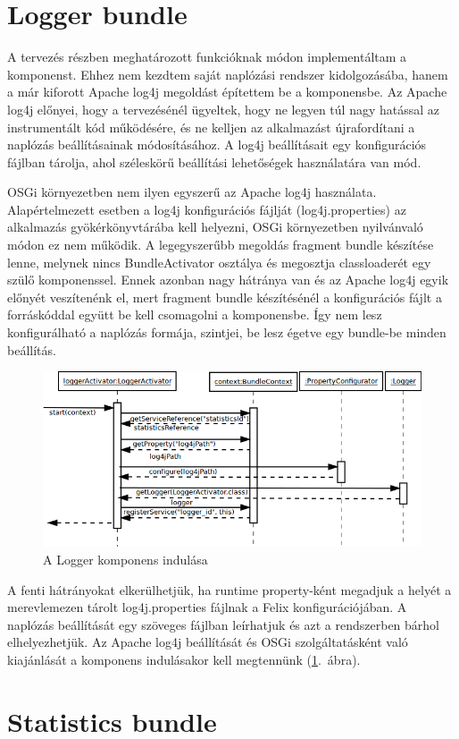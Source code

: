 
\section{Logger bundle}
\label{sec:loggerbundle}

A tervezés részben meghatározott funkcióknak módon implementáltam a komponenst. Ehhez nem kezdtem saját naplózási rendszer kidolgozásába, hanem a már kiforott Apache log4j megoldást építettem be a komponensbe. Az Apache log4j előnyei, hogy a tervezésénél ügyeltek, hogy ne legyen túl nagy hatással az instrumentált kód működésére, és ne kelljen az alkalmazást újrafordítani a naplózás beállításainak módosításához. A log4j beállításait egy konfigurációs fájlban tárolja, ahol széleskörű beállítási lehetőségek használatára van mód.

OSGi környezetben nem ilyen egyszerű az Apache log4j használata. Alapértelmezett esetben a log4j konfigurációs fájlját (log4j.properties) az alkalmazás gyökérkönyvtárába kell helyezni, OSGi környezetben nyilvánvaló módon ez nem működik. A legegyszerűbb megoldás fragment bundle készítése lenne, melynek nincs BundleActivator osztálya és megosztja classloaderét egy szülő komponenssel. Ennek azonban nagy hátránya van és az Apache log4j egyik előnyét veszítenénk el, mert fragment bundle készítésénél a konfigurációs fájlt a forráskóddal együtt be kell csomagolni a komponensbe. Így nem lesz konfigurálható a naplózás formája, szintjei, be lesz égetve egy bundle-be minden beállítás.

\begin{figure}[htp]
\centering
\includegraphics[scale=0.5]{img/sequence_logger}
\caption{A Logger komponens indulása}
\label{fig:sequence_logger}
\end{figure}

A fenti hátrányokat elkerülhetjük, ha runtime property-ként megadjuk a helyét a merevlemezen tárolt log4j.properties fájlnak a Felix konfigurációjában. A naplózás beállítását egy szöveges fájlban leírhatjuk és azt a rendszerben bárhol elhelyezhetjük. Az Apache log4j beállítását és OSGi szolgáltatásként való kiajánlását a komponens indulásakor kell megtennünk (\ref{fig:sequence_logger}.~ábra).


\section{Statistics bundle}
\label{sec:statisticsbundle}


